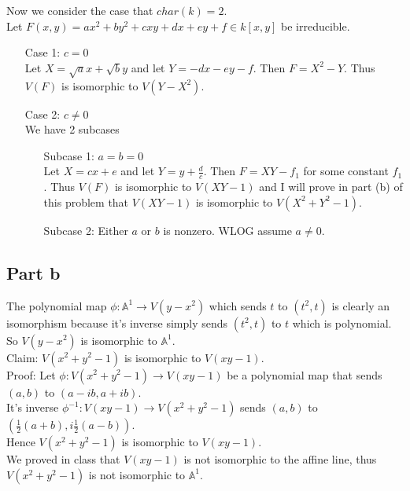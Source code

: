 \documentclass[12pt]{article}
\begin{document}
\begin{enumerate}
\clearpage
Now we consider the case that $char(k)=2$.\\
Let $F(x,y)=ax^2+by^2+cxy+dx+ey+f \in k[x,y]$ be irreducible. \\
\begin{enumerate}
\item[Case 1:] $c=0$ \\
Let $X=\sqrt{a}x+\sqrt{b}y$ and let $Y=-dx-ey-f$. Then $F=X^2-Y$. Thus $V(F)$ is isomorphic to $V(Y-X^2)$.
\item[Case 2:] $c \not=0$\\
We have 2 subcases
\begin{enumerate}
\item[Subcase 1:] $a=b=0$ \\
Let $X=cx+e$ and let $Y=y+\frac{d}{c}$. Then
$F=XY-f_1$ for some constant $f_1$. Thus $V(F)$ is isomorphic to $V(XY-1)$ and I will prove in part (b) of this problem that $V(XY-1)$ is isomorphic to $V(X^2+Y^2-1)$.
\item[Subcase 2:] Either $a$ or $b$ is nonzero. WLOG assume $a \not= 0$. \\
\end{enumerate}
\end{enumerate}


\clearpage
\subsection*{Part b}
The polynomial map $\phi: \mathbb{A}^1 \rightarrow V(y-x^2)$
which sends $t$ to $(t^2,t)$ is clearly an isomorphism because it's inverse simply sends $(t^2,t)$ to $t$ which is polynomial. So $V(y-x^2)$ is isomorphic to $\mathbb{A}^1$. \\
Claim: $V(x^2+y^2-1)$ is isomorphic to $V(xy-1)$.
\\
Proof: Let $\phi:V(x^2+y^2-1) \rightarrow V(xy-1)$ be a polynomial map that sends $(a,b)$ to $(a-ib,a+ib)$.\\ 
It's inverse $\phi^{-1}: V(xy-1)
\rightarrow V(x^2+y^2-1)$ sends $(a,b)$ to
$(\frac{1}{2}(a+b),i\frac{1}{2}(a-b))$. \\
Hence $V(x^2+y^2-1)$ is isomorphic to $V(xy-1)$.
\\
We proved in class that $V(xy-1)$ is not isomorphic to the affine line, thus $V(x^2+y^2-1)$ is not isomorphic to $\mathbb{A}^1$.


\end{enumerate}
\end{document}
